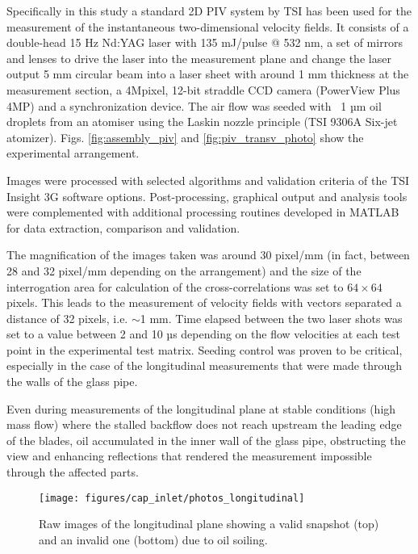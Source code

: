 Specifically in this study a standard 2D PIV system by TSI has been used for the measurement of the instantaneous two-dimensional velocity fields. It consists of a double-head 15 Hz Nd:YAG laser with 135 mJ/pulse @ 532 nm, a set of mirrors and lenses to drive the laser into the measurement plane and change the laser output 5 mm circular beam into a laser sheet with around 1 mm thickness at the measurement section, a 4Mpixel, 12-bit straddle CCD camera (PowerView Plus 4MP) and a synchronization device.
The air flow was seeded with ~1 µm oil droplets from an atomiser using the Laskin nozzle principle (TSI 9306A Six-jet atomizer). Figs. \ref{fig:assembly_piv} and \ref{fig:piv_transv_photo} show the experimental arrangement.

Images were processed with selected algorithms and validation criteria of the TSI Insight 3G software options. Post-processing, graphical output and analysis tools were complemented with additional processing routines developed in MATLAB for data extraction, comparison and validation.

The magnification of the images taken was around 30 pixel/mm (in fact, between 28 and 32 pixel/mm depending on the arrangement) and the size of the interrogation area for calculation of the cross-correlations was set to $64\times 64$ pixels. This leads to the measurement of velocity fields with vectors separated a distance of 32 pixels, i.e. $\sim$1 mm. Time elapsed between the two laser shots was set to a value between 2 and 10 µs depending on the flow velocities at each test point in the experimental test matrix. Seeding control was proven to be critical, especially in the case of the longitudinal measurements that were made through the walls of the glass pipe.

Even during measurements of the longitudinal plane at stable conditions (high mass flow) where the stalled backflow does not reach upstream the leading edge of the blades, oil accumulated in the inner wall of the glass pipe, obstructing the view and enhancing reflections that rendered the measurement impossible through the affected parts.

\begin{figure}[!t]
\centering
\texttt{[image: figures/cap\_inlet/photos\_longitudinal]}
\caption[Raw images of the longitudinal plane PIV measurement]{Raw images of the longitudinal plane showing a valid snapshot (top) and an invalid one (bottom) due to oil soiling.}
\label{fig:photos_longitudinal}
\end{figure}

